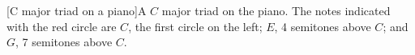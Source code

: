 [C major triad on a piano]A $C$ major triad on the piano. The notes indicated with the red circle are $C$, the first circle on the left; $E$, 4 semitones above $C$; and $G$, 7 semitones above $C$.